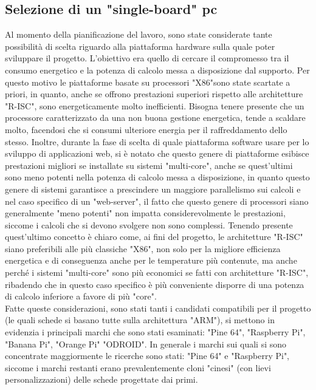 \subsection{Selezione di un "single-board" pc}
Al momento della pianificazione del lavoro, sono state considerate tante possibilità di scelta riguardo alla piattaforma hardware sulla quale poter sviluppare il progetto. L'obiettivo era quello di cercare il compromesso tra il consumo energetico e la potenza di calcolo messa a disposizione dal supporto. Per questo motivo le piattaforme basate su processori "X86"sono state scartate a priori, in quanto, anche se offrono prestazioni superiori rispetto alle architetture "R-ISC", sono energeticamente molto inefficienti. Bisogna tenere presente che un processore caratterizzato da una non buona gestione energetica, tende a scaldare molto, facendosi che si consumi ulteriore energia per il raffreddamento dello stesso.  Inoltre, durante la fase di scelta di quale piattaforma software usare per lo sviluppo di applicazioni web, si è notato che questo genere di piattaforme esibisce prestazioni migliori se installate su sistemi "multi-core", anche se quest'ultimi sono meno potenti nella potenza di calcolo messa a disposizione, in quanto questo genere di sistemi garantisce a prescindere un maggiore parallelismo sui calcoli e nel caso specifico di un "web-server", il fatto che questo genere di processori siano generalmente "meno potenti" non impatta considerevolmente le prestazioni, siccome i calcoli che si devono svolgere non sono complessi. Tenendo presente quest'ultimo concetto è chiaro come, ai fini del progetto, le architetture "R-ISC" siano preferibili alle più classiche "X86", non solo per la migliore efficienza energetica e di conseguenza anche per le temperature più contenute, ma anche perché i sistemi "multi-core" sono più economici se fatti con architetture "R-ISC", ribadendo che in questo caso specifico è più conveniente disporre di una potenza di calcolo inferiore a favore di più "core".\\
Fatte queste considerazioni, sono stati tanti i candidati compatibili per il progetto (le quali schede si basano tutte sulla architettura "ARM"), si mettono in evidenzia i principali marchi che sono stati esaminati: "Pine 64", "Raspberry Pi", "Banana Pi", "Orange Pi" "ODROID". In generale i marchi sui quali si sono concentrate maggiormente le ricerche sono stati: "Pine 64" e "Raspberry Pi", siccome i marchi restanti erano prevalentemente cloni "cinesi" (con lievi personalizzazioni) delle schede progettate dai primi.\\
